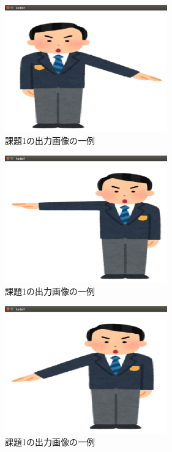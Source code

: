 \documentclass{jarticle}
\begin{document}
	\begin{figure}[H]
	\begin{center}
	\includegraphics[width=7.0cm]{images/kadai1-2.png}
	\caption{課題1の出力画像の一例}
	\label{fig:kadai1-2}
	\end{center}
	\end{figure}


	\begin{figure}[H]
	\begin{center}
	\includegraphics[width=7.0cm]{images/kadai1-3.png}
	\caption{課題1の出力画像の一例}
	\label{fig:kadai1-3}
	\end{center}
	\end{figure}


	\begin{figure}[H]
	\begin{center}
	\includegraphics[width=7.0cm]{images/kadai1-4.png}
	\caption{課題1の出力画像の一例}
	\label{fig:kadai1-4}
	\end{center}
	\end{figure}
\end{document}
